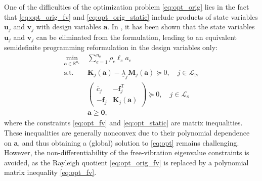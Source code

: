 \documentclass[final,onefignum,onetabnum]{siamart220329}
\begin{document}
One of the difficulties of the optimization problem \eqref{eq:opt_orig} lies in the fact that \eqref{eq:opt_orig_fv} and \eqref{eq:opt_orig_static} include products of state variables $\mathbf{u}_j$ and $\mathbf{v}_j$ with design variables $\mathbf{a}$. In \cite[Proposition 2.3]{Achtziger2008}, it has been shown that the state variables $\mathbf{u}_j$ and $\mathbf{v}_j$ can be eliminated from the formulation, leading to an equivalent semidefinite programming reformulation in the design variables only:
%
\begin{subequations}\label{eq:opt}
\begin{align}
	\min_{\mathbf{a}\in \mathbb{R}^{n_{\mathrm{e}}}}\; & \sum_{e=1}^{n_\mathrm{e} } \rho_e \ell_e a_e\label{eq:opt_objective}\\
	\text{s.t.}\; & \mathbf{K}_j(\mathbf{a}) - \underline{\lambda}_j \mathbf{M}_j(\mathbf{a}) \succeq 0,\quad j \in {\mathcal{L}_\mathrm{fv}}\label{eq:opt_fv}\\
	& \begin{pmatrix}
		\overline{c}_j & -\mathbf{f}_j^\mathrm{T}\\
		-\mathbf{f}_j & \mathbf{K}_j(\mathbf{a})
	\end{pmatrix} \succeq 0,\quad j \in {\mathcal{L}_\mathrm{s}}\label{eq:opt_static}\\
	& \mathbf{a} \ge \mathbf{0},\label{eq:opt_nonneg}
\end{align}
\end{subequations}
%
where the constraints \eqref{eq:opt_fv} and \eqref{eq:opt_static} are matrix inequalities. These inequalities are generally nonconvex due to their polynomial dependence on $\mathbf{a}$, and thus obtaining a (global) solution to \eqref{eq:opt} remains challenging. {However, the non-differentiability of the free-vibration eigenvalue constraints is avoided, as the Rayleigh quotient \eqref{eq:opt_orig_fv} is replaced by a polynomial matrix inequality \eqref{eq:opt_fv}.}
\end{document}
